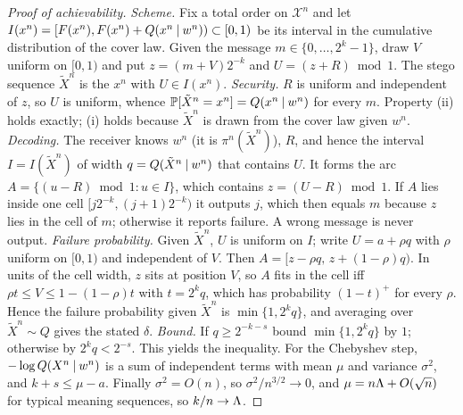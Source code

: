 \begin{proof}[Proof of achievability]
\emph{Scheme.} Fix a total order on $\mathcal X^n$ and let $I(x^n)=[F(x^n),F(x^n)+Q(x^n\mathbin{\vert} w^n))\subset[0,1)$ be its interval in the cumulative distribution of the cover law. Given the message $m\in\{0,\dots,2^k-1\}$, draw $V$ uniform on $[0,1)$ and put $z=(m+V)2^{-k}$ and $U=(z+R)\bmod1$. The stego sequence $\tilde X^n$ is the $x^n$ with $U\in I(x^n)$.
\emph{Security.} $R$ is uniform and independent of $z$, so $U$ is uniform, whence $\mathbb{P}[\tilde X^n=x^n]=Q(x^n\mathbin{\vert} w^n)$ for every $m$. Property (ii) holds exactly; (i) holds because $\tilde X^n$ is drawn from the cover law given $w^n$.
\emph{Decoding.} The receiver knows $w^n$ (it is $\pi^n(\tilde X^n)$), $R$, and hence the interval $I=I(\tilde X^n)$ of width $q=Q(\tilde X^n\mathbin{\vert} w^n)$ that contains $U$. It forms the arc $A=\{(u-R)\bmod1:u\in I\}$, which contains $z=(U-R)\bmod1$. If $A$ lies inside one cell $[j2^{-k},(j+1)2^{-k})$ it outputs $j$, which then equals $m$ because $z$ lies in the cell of $m$; otherwise it reports failure. A wrong message is never output.
\emph{Failure probability.} Given $\tilde X^n$, $U$ is uniform on $I$; write $U=a+\rho q$ with $\rho$ uniform on $[0,1)$ and independent of $V$. Then $A=[z-\rho q,\,z+(1-\rho)q)$. In units of the cell width, $z$ sits at position $V$, so $A$ fits in the cell iff $\rho t\le V\le1-(1-\rho)t$ with $t=2^kq$, which has probability $(1-t)^+$ for every $\rho$. Hence the failure probability given $\tilde X^n$ is $\min\{1,2^kq\}$, and averaging over $\tilde X^n\sim Q$ gives the stated $\delta$.
\emph{Bound.} If $q\ge2^{-k-s}$ bound $\min\{1,2^kq\}$ by $1$; otherwise by $2^kq<2^{-s}$. This yields the inequality. For the Chebyshev step, $-\log Q(X^n\mathbin{\vert} w^n)$ is a sum of independent terms with mean $\mu$ and variance $\sigma^2$, and $k+s\le\mu-a$. Finally $\sigma^2=O(n)$, so $\sigma^2/n^{3/2}\to0$, and $\mu=n\Lambda+O(\sqrt n)$ for typical meaning sequences, so $k/n\to\Lambda$.
\end{proof}

